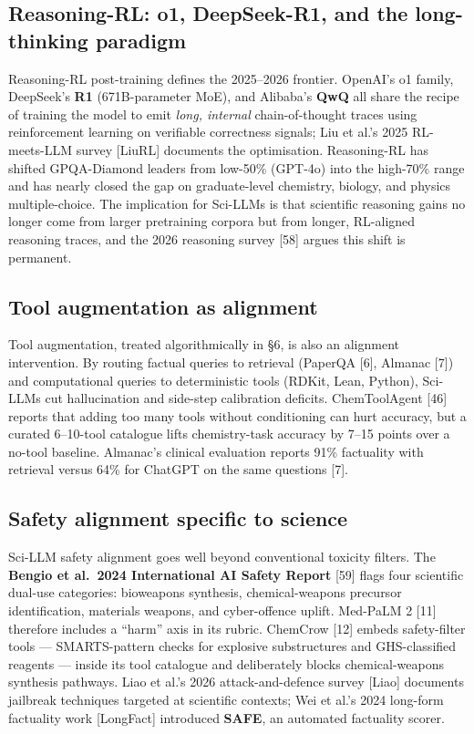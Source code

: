 \subsection{Reasoning-RL: o1, DeepSeek-R1, and the long-thinking paradigm}\label{reasoning-rl-o1-deepseek-r1-and-the-long-thinking-paradigm}

Reasoning-RL post-training defines the 2025--2026 frontier. OpenAI's o1 family, DeepSeek's \textbf{R1} (671B-parameter MoE), and Alibaba's \textbf{QwQ} all share the recipe of training the model to emit \emph{long, internal} chain-of-thought traces using reinforcement learning on verifiable correctness signals; Liu et al.'s 2025 RL-meets-LLM survey {[}LiuRL{]} documents the optimisation. Reasoning-RL has shifted GPQA-Diamond leaders from low-50\% (GPT-4o) into the high-70\% range and has nearly closed the gap on graduate-level chemistry, biology, and physics multiple-choice. The implication for Sci-LLMs is that scientific reasoning gains no longer come from larger pretraining corpora but from longer, RL-aligned reasoning traces, and the 2026 reasoning survey {[}58{]} argues this shift is permanent.

\subsection{Tool augmentation as alignment}\label{tool-augmentation-as-alignment}

Tool augmentation, treated algorithmically in §6, is also an alignment intervention. By routing factual queries to retrieval (PaperQA {[}6{]}, Almanac {[}7{]}) and computational queries to deterministic tools (RDKit, Lean, Python), Sci-LLMs cut hallucination and side-step calibration deficits. ChemToolAgent {[}46{]} reports that adding too many tools without conditioning can hurt accuracy, but a curated 6--10-tool catalogue lifts chemistry-task accuracy by 7--15 points over a no-tool baseline. Almanac's clinical evaluation reports 91\% factuality with retrieval versus 64\% for ChatGPT on the same questions {[}7{]}.

\subsection{Safety alignment specific to science}\label{safety-alignment-specific-to-science}

Sci-LLM safety alignment goes well beyond conventional toxicity filters. The \textbf{Bengio et al.~2024 International AI Safety Report} {[}59{]} flags four scientific dual-use categories: bioweapons synthesis, chemical-weapons precursor identification, materials weapons, and cyber-offence uplift. Med-PaLM 2 {[}11{]} therefore includes a ``harm'' axis in its rubric. ChemCrow {[}12{]} embeds safety-filter tools --- SMARTS-pattern checks for explosive substructures and GHS-classified reagents --- inside its tool catalogue and deliberately blocks chemical-weapons synthesis pathways. Liao et al.'s 2026 attack-and-defence survey {[}Liao{]} documents jailbreak techniques targeted at scientific contexts; Wei et al.'s 2024 long-form factuality work {[}LongFact{]} introduced \textbf{SAFE}, an automated factuality scorer.

